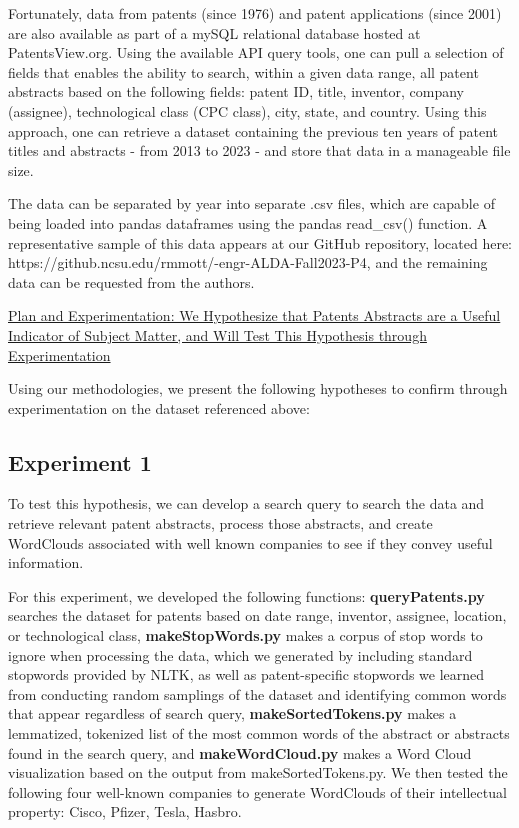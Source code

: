 \documentclass{article}
\begin{document}
Fortunately, data from patents (since 1976) and patent applications (since 2001) are also available as part of a mySQL relational database hosted at PatentsView.org\cite{website:pv1}. Using the available API query tools\cite{website:pv2}, one can pull a selection of fields that enables the ability to search, within a given data range, all patent abstracts based on the following fields: patent ID, title, inventor, company (assignee), technological class (CPC class), city, state, and country.  Using this approach, one can retrieve a dataset containing the previous ten years of patent titles and abstracts - from 2013 to 2023 - and store that data in a manageable file size.  

The data can be separated by year into separate .csv files, which are capable of being loaded into pandas dataframes using the pandas read\_csv() function.  A representative sample of this data appears at our GitHub repository, located here: https://github.ncsu.edu/rmmott/-engr-ALDA-Fall2023-P4, and the remaining data can be requested from the authors.  

\ul{Plan and Experimentation: We Hypothesize that Patents Abstracts are a Useful Indicator of Subject Matter, and Will Test This Hypothesis through Experimentation}

Using our methodologies, we present the following hypotheses to confirm through experimentation on the dataset referenced above:

\subsection{Experiment 1}
\noindent{}

To test this hypothesis, we can develop a search query to search the data and retrieve relevant patent abstracts, process those abstracts, and create WordClouds associated with well known companies to see if they convey useful information.

For this experiment, we developed the following functions: \textbf{queryPatents.py} searches the dataset for patents based on date range, inventor, assignee, location, or technological class, \textbf{makeStopWords.py} makes a corpus of stop words to ignore when processing the data, which we generated by including standard stopwords provided by NLTK, as well as patent-specific stopwords we learned from conducting random samplings of the dataset and identifying common words that appear regardless of search query, \textbf{makeSortedTokens.py} makes a lemmatized, tokenized list of the most common words of the abstract or abstracts found in the search query, and \textbf{makeWordCloud.py} makes a Word Cloud visualization based on the output from makeSortedTokens.py. We then tested the following four well-known companies to generate WordClouds of their intellectual property: Cisco, Pfizer, Tesla, Hasbro.
\end{document}
